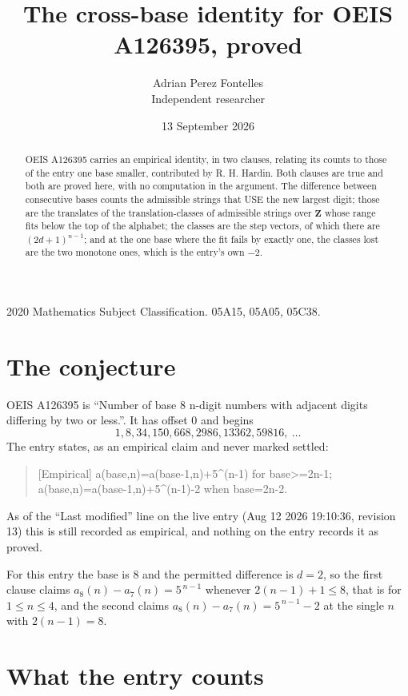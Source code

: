\documentclass[11pt,a4paper]{article}
\title{The cross-base identity for OEIS A126395, proved}
\author{Adrian Perez Fontelles\\ \small Independent researcher}
\date{13 September 2026}
\theoremstyle{plain}
\theoremstyle{definition}
\begin{document}
\maketitle

\begin{abstract}
OEIS A126395 carries an empirical identity, in two clauses, relating its counts to those of the
entry one base smaller, contributed by R. H. Hardin. Both clauses are true and both are proved
here, with no computation in the argument. The difference between consecutive bases counts the
admissible strings that USE the new largest digit; those are the translates of the
translation-classes of admissible strings over $\mathbf{Z}$ whose range fits below the top of
the alphabet; the classes are the step vectors, of which there are $(2d+1)^{n-1}$; and at the
one base where the fit fails by exactly one, the classes lost are the two monotone ones, which
is the entry's own $-2$.
\end{abstract}

\noindent\small 2020 Mathematics Subject Classification. 05A15, 05A05, 05C38.\normalsize

\section{The conjecture}

OEIS A126395 is ``Number of base 8 n-digit numbers with adjacent digits differing by two or less.''. It has offset $0$ and begins
\[
1, 8, 34, 150, 668, 2986, 13362, 59816,\ \dots
\]
The entry states, as an empirical claim and never marked settled:
\begin{quote}
[Empirical] a(base,n)=a(base-1,n)+5\textasciicircum{}(n-1) for base>=2n-1; a(base,n)=a(base-1,n)+5\textasciicircum{}(n-1)-2 when base=2n-2.
\end{quote}
As of the ``Last modified'' line on the live entry (Aug 12 2026 19:10:36, revision 13)
this is still recorded as empirical, and nothing on the entry records it as proved.

For this entry the base is $8$ and the permitted difference is $d=2$, so the first clause
claims $a_{8}(n)-a_{7}(n)=5^{\,n-1}$ whenever $2(n-1)+1\le8$, that is for
$1\le n\le4$, and the second claims $a_{8}(n)-a_{7}(n)=5^{\,n-1}-2$ at the single
$n$ with $2(n-1)=8$.

\section{What the entry counts}
\end{document}
